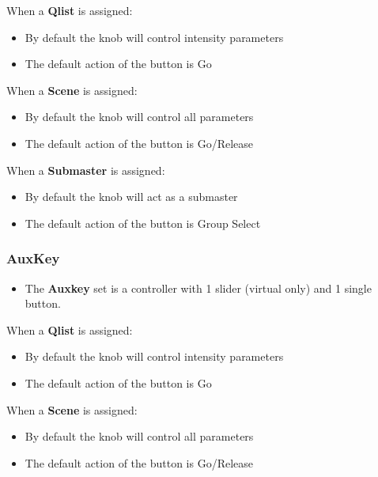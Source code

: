 \documentclass[
]{article}
\providecommand{\tightlist}{%
  \setlength{\itemsep}{0pt}\setlength{\parskip}{0pt}}
\begin{document}
When a \textbf{Qlist} is assigned:

\begin{itemize}
\item
  By default the knob will control intensity parameters
\item
  The default action of the button is Go
\end{itemize}

When a \textbf{Scene} is assigned:

\begin{itemize}
\item
  By default the knob will control all parameters
\item
  The default action of the button is Go/Release
\end{itemize}

When a \textbf{Submaster} is assigned:

\begin{itemize}
\item
  By default the knob will act as a submaster
\item
  The default action of the button is Group Select
\end{itemize}

\hypertarget{auxkey}{%
\subsubsection{AuxKey}\label{auxkey}}

\begin{itemize}
\tightlist
\item
  The \textbf{Auxkey} set is a controller with 1 slider (virtual only) and 1 single button.
\end{itemize}

When a \textbf{Qlist} is assigned:

\begin{itemize}
\item
  By default the knob will control intensity parameters
\item
  The default action of the button is Go
\end{itemize}

When a \textbf{Scene} is assigned:

\begin{itemize}
\item
  By default the knob will control all parameters
\item
  The default action of the button is Go/Release
\end{itemize}
\end{document}
